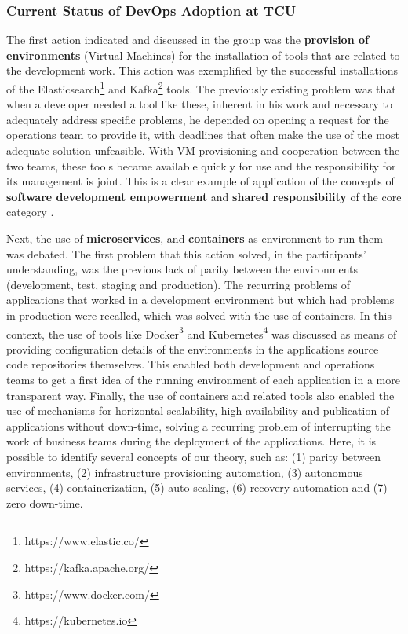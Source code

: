 \subsubsection{Current Status of DevOps Adoption at TCU}

{
\color{blue}
The first action indicated and discussed in the group was the \textbf{provision of
environments} (Virtual Machines) for the installation of tools that are related
to the development work. This action was exemplified by the successful
installations of the Elasticsearch\footnote{https://www.elastic.co/} and
Kafka\footnote{https://kafka.apache.org/} tools. The previously existing problem
was that when a developer needed a tool like these, inherent in his work and
necessary to adequately address specific problems, he depended on opening a
request for the operations team to provide it, with deadlines that often make
the use of the most adequate solution unfeasible. With VM provisioning and
cooperation between the two teams, these tools became available quickly for use
and the responsibility for its management is joint. This is a clear example of
application of the concepts of \textbf{software development empowerment} and
\textbf{shared responsibility} of the core category \cc.

Next, the use of \textbf{microservices}, and \textbf{containers} as environment
to run them was debated. The first problem that this action solved, in the
participants' understanding, was the previous lack of parity between the environments
(development, test, staging and production). The recurring problems of
applications that worked in a development environment but which had problems
in production were recalled, which was solved with the use of containers. In
this context, the use of tools like Docker\footnote{https://www.docker.com/}
and Kubernetes\footnote{https://kubernetes.io} was discussed as means of providing
configuration details of the environments in the applications source code
repositories themselves. This enabled both development and operations teams to
get a first idea of the running environment of each application in a more
transparent way. Finally, the use of containers and related tools also enabled
the use of mechanisms for horizontal scalability, high availability and
publication of applications without down-time, solving a recurring problem of
interrupting the work of business teams during the deployment of the applications.
Here, it is possible to identify several concepts of our theory, such as:
(1) parity between environments, (2) infrastructure provisioning automation,
(3) autonomous services, (4) containerization, (5) auto scaling, (6) recovery
automation and (7) zero down-time.

}
